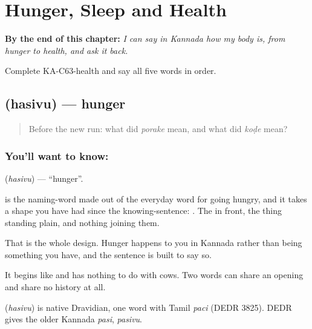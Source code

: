 
\chapter{Hunger, Sleep and Health}
\label{ch:ka-health}

\begin{chapteropening}
\textbf{By the end of this chapter:} \emph{I can say in Kannada how my body is, from hunger to health, and ask it back.}

Complete KA-C63-health and say all five words in order.
\end{chapteropening}

\section[\texorpdfstring{\kn{ಹಸಿವು} (hasivu)}{ಹಸಿವು (hasivu)}]{ (hasivu) — hunger}

\label{lesson:KA-C63-hunger}



\begin{quote}
Before the new run: what did \emph{porake} mean, and what did \emph{koḍe} mean?
\end{quote}

\subsection*{You'll want to know: }
\textbf{} (\emph{hasivu}) — \textquotedblleft{}hunger\textquotedblright{}.

 is the naming-word made out of the everyday word for going hungry, and it takes a shape you have had since the knowing-sentence:  . The  in front, the thing standing plain, and nothing joining them.

That is the whole design. Hunger happens to you in Kannada rather than being something you have, and the sentence is built to say so.

It begins like  and has nothing to do with cows. Two words can share an opening and share no history at all.

\begin{cousinweb}
\textbf{} (\emph{hasivu}) is native Dravidian, one word with Tamil \emph{paci} (DEDR 3825). DEDR gives the older Kannada \emph{pasi}, \emph{pasivu}.
\end{cousinweb}

